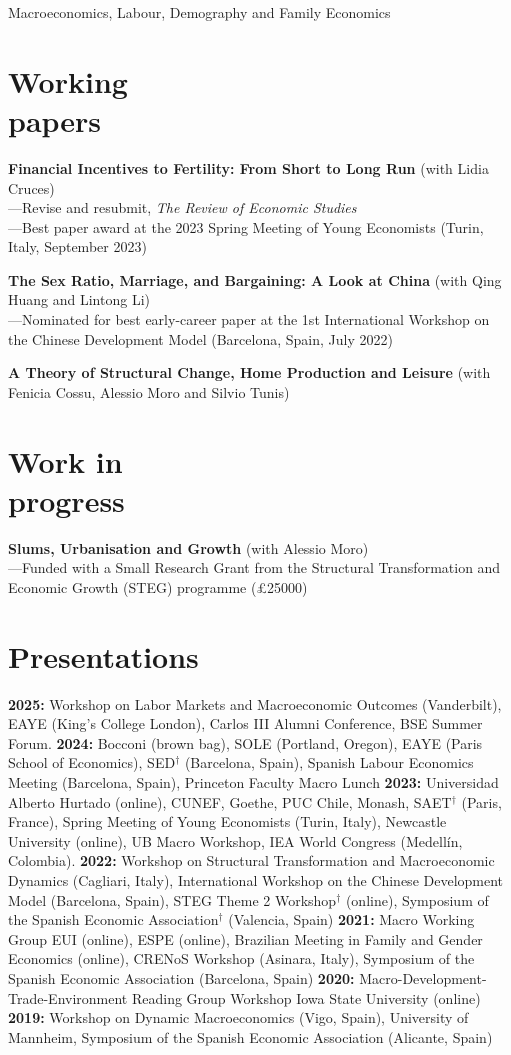 \documentclass[margin]{res} %
\begin{document}
\begin{resume}
Macroeconomics, Labour, Demography and Family Economics

\section{Working \\ papers}
{\bf Financial Incentives to Fertility: From Short to Long Run} (with Lidia Cruces) \\
---Revise and resubmit, {\sl The Review of Economic Studies} \\
---Best paper award at the 2023 Spring Meeting of Young Economists (Turin, Italy, September 2023)

{\bf The Sex Ratio, Marriage, and Bargaining: A Look at China} (with Qing Huang and Lintong Li) \\
---Nominated for best early-career paper at the 1st International Workshop on the Chinese Development Model (Barcelona, Spain, July 2022) 

{\bf A Theory of Structural Change, Home Production and Leisure} (with Fenicia Cossu, Alessio Moro and Silvio Tunis) 

\section{Work in \\ progress}
{\bf Slums, Urbanisation and Growth} (with Alessio Moro) \\
---Funded with a Small Research Grant from the Structural Transformation and Economic Growth (STEG) programme (£25000)

\section{Presentations}

{\bf 2025:} Workshop on Labor Markets and Macroeconomic Outcomes (Vanderbilt), EAYE (King's College London), Carlos III Alumni Conference, BSE Summer Forum. 
{\bf 2024:} Bocconi (brown bag), SOLE (Portland, Oregon), EAYE (Paris School of Economics), SED$^\dagger$ (Barcelona, Spain), Spanish Labour Economics Meeting (Barcelona, Spain), Princeton Faculty Macro Lunch {\bf 2023:} Universidad Alberto Hurtado (online), CUNEF, Goethe, PUC Chile, Monash, SAET$^\dagger$ (Paris, France), Spring Meeting of Young Economists (Turin, Italy), Newcastle University (online), UB Macro Workshop, IEA World Congress (Medell\'in, Colombia). {\bf 2022:} Workshop on Structural Transformation and Macroeconomic Dynamics (Cagliari, Italy), International Workshop on the Chinese Development Model (Barcelona, Spain), STEG Theme 2 Workshop$^\dagger$ (online), Symposium of the Spanish Economic Association$^\dagger$ (Valencia, Spain) {\bf 2021:} Macro Working Group EUI (online), ESPE (online), Brazilian Meeting in Family and Gender Economics (online), CRENoS Workshop (Asinara, Italy), Symposium of the Spanish Economic Association (Barcelona, Spain) {\bf 2020:} Macro-Development-Trade-Environment Reading Group Workshop Iowa State University (online) {\bf 2019:} Workshop on Dynamic Macroeconomics (Vigo, Spain), University of Mannheim, Symposium of the Spanish Economic Association (Alicante, Spain)


\end{resume}
\end{document}
